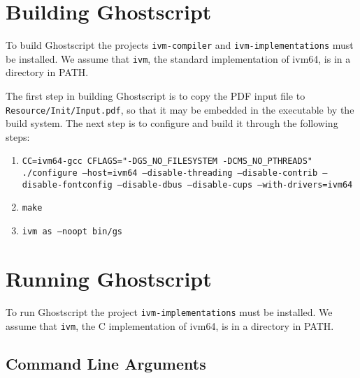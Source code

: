 \documentclass[a4paper,11pt]{article}
\newcommand{\code}[1]{\texttt{#1}}
\begin{document}
\section{Building Ghostscript}
\label{sec:building-ghostview}

To build Ghostscript the projects \code{ivm-compiler} and \code{ivm-implementations} must be installed.
We assume that \code{ivm}, the standard implementation of ivm64, is in a directory in PATH.

The first step in building Ghostscript is to copy the PDF input file to \code{Resource/Init/Input.pdf}, so that it may be embedded in the executable by the build system.
The next step is to configure and build it through the following steps:
\begin{enumerate}
\item \code{CC=ivm64-gcc CFLAGS="-DGS\_NO\_FILESYSTEM -DCMS\_NO\_PTHREADS" ./configure --host=ivm64 --disable-threading --disable-contrib --disable-fontconfig --disable-dbus --disable-cups --with-drivers=ivm64}
\item \code{make}
\item \code{ivm as --noopt bin/gs}
\end{enumerate}

\section{Running Ghostscript}
\label{sec:running-ghostview}

To run Ghostscript the project \code{ivm-implementations} must be installed.
We assume that \code{ivm}, the C implementation of ivm64, is in a directory in PATH.

\subsection{Command Line Arguments}
\end{document}
